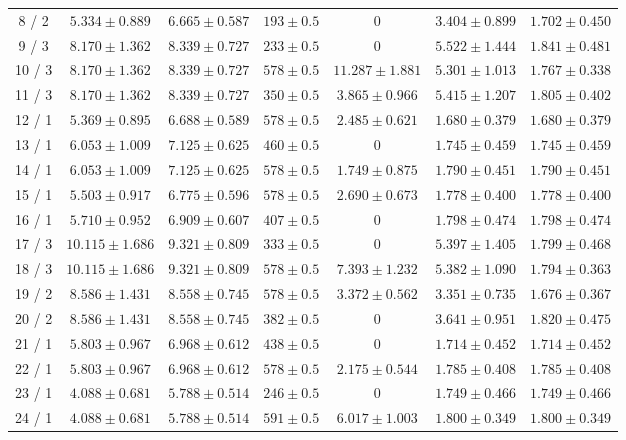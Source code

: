 \documentclass[12pt,a4paper]{article}
\begin{document}
\begin{table}[H]
{\begin{tabular}{ccccccc}
        8 / 2 & $5.334\pm0.889$ & $6.665\pm0.587$ & $193\pm0.5$ & $0$ & $3.404\pm0.899$ & $1.702\pm0.450$ \\
        9 / 3 & $8.170\pm1.362$ & $8.339\pm0.727$ & $233\pm0.5$ & $0$ & $5.522\pm1.444$ & $1.841\pm0.481$ \\
        10 / 3 & $8.170\pm1.362$ & $8.339\pm0.727$ & $578\pm0.5$ & $11.287\pm1.881$ & $5.301\pm1.013$ & $1.767\pm0.338$ \\
        11 / 3 & $8.170\pm1.362$ & $8.339\pm0.727$ & $350\pm0.5$ & $3.865\pm0.966$ & $5.415\pm1.207$ & $1.805\pm0.402$ \\
        12 / 1 & $5.369\pm0.895$ & $6.688\pm0.589$ & $578\pm0.5$ & $2.485\pm0.621$ & $1.680\pm0.379$ & $1.680\pm0.379$ \\
        13 / 1 & $6.053\pm1.009$ & $7.125\pm0.625$ & $460\pm0.5$ & $0$ & $1.745\pm0.459$ & $1.745\pm0.459$ \\
        14 / 1 & $6.053\pm1.009$ & $7.125\pm0.625$ & $578\pm0.5$ & $1.749\pm0.875$ & $1.790\pm0.451$ & $1.790\pm0.451$ \\
        15 / 1 & $5.503\pm0.917$ & $6.775\pm0.596$ & $578\pm0.5$ & $2.690\pm0.673$ & $1.778\pm0.400$ & $1.778\pm0.400$ \\
        16 / 1 & $5.710\pm0.952$ & $6.909\pm0.607$ & $407\pm0.5$ & $0$ & $1.798\pm0.474$ & $1.798\pm0.474$ \\
        17 / 3 & $10.115\pm1.686$ & $9.321\pm0.809$ & $333\pm0.5$ & $0$ & $5.397\pm1.405$ & $1.799\pm0.468$ \\
        18 / 3 & $10.115\pm1.686$ & $9.321\pm0.809$ & $578\pm0.5$ & $7.393\pm1.232$ & $5.382\pm1.090$ & $1.794\pm0.363$ \\
        19 / 2 & $8.586\pm1.431$ & $8.558\pm0.745$ & $578\pm0.5$ & $3.372\pm0.562$ & $3.351\pm0.735$ & $1.676\pm0.367$ \\
        20 / 2 & $8.586\pm1.431$ & $8.558\pm0.745$ & $382\pm0.5$ & $0$ & $3.641\pm0.951$ & $1.820\pm0.475$ \\
        21 / 1 & $5.803\pm0.967$ & $6.968\pm0.612$ & $438\pm0.5$ & $0$ & $1.714\pm0.452$ & $1.714\pm0.452$ \\
        22 / 1 & $5.803\pm0.967$ & $6.968\pm0.612$ & $578\pm0.5$ & $2.175\pm0.544$ & $1.785\pm0.408$ & $1.785\pm0.408$ \\
        23 / 1 & $4.088\pm0.681$ & $5.788\pm0.514$ & $246\pm0.5$ & $0$ & $1.749\pm0.466$ & $1.749\pm0.466$ \\
        24 / 1 & $4.088\pm0.681$ & $5.788\pm0.514$ & $591\pm0.5$ & $6.017\pm1.003$ & $1.800\pm0.349$ & $1.800\pm0.349$ \\

\end{tabular}}
\end{table}
\end{document}
